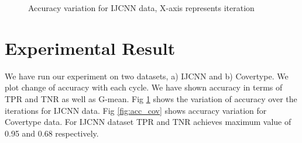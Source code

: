 \documentclass{article} %
\begin{document}
\begin{figure}
\caption{Accuracy variation for IJCNN data, X-axis represents iteration}
\label{fig:acc_ijcnn}
\end{figure}

\section{Experimental Result}

We have run our experiment on two datasets, a) IJCNN and b) Covertype. We plot change of accuracy with each cycle. We have shown accuracy in terms of TPR and TNR as well as G-mean. Fig \ref{fig:acc_ijcnn} shows the variation of accuracy over the iterations for IJCNN data. Fig \ref{fig:acc_cov} shows accuracy variation for Covertype data. For IJCNN dataset TPR and TNR achieves maximum value of 0.95 and 0.68 respectively.
\end{document}
